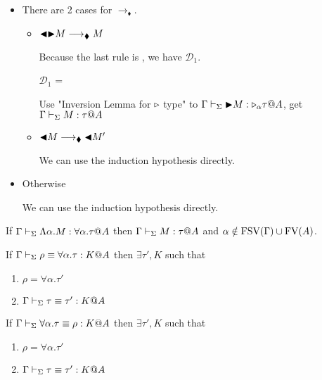 \begin{itemize}
\newcommand{\R}{\longrightarrow_{\blacklozenge}}

\item \TTBL

	      There are 2 cases for $\R$.

	      \begin{itemize}
		      \item $\TBL\TB M \R M$

		            Because the last rule is \TTBL, we have $\mathcal{D}_1$.

		            $\mathcal{D}_1$ = 
		            {}

		            Use "Inversion Lemma for ${\mathop{\triangleright}}$ type" to $\Gamma \vdash_\Sigma {\mathop{\blacktriangleright}} M : {\mathop{\triangleright}}_\alpha \tau @A$,  get $\Gamma \vdash_\Sigma M : \tau @A$

		      \item $\TBL M \R \TBL M'$

		            We can use the induction hypothesis directly.
	      \end{itemize}

	\item Otherwise

	      We can use the induction hypothesis directly.
\end{itemize}

\begin{lemma}
	\begin{item}
	      \item If $\G \V \Lambda\alpha.M : \forall\alpha.\tau@A$ then $\Gamma \vdash_\Sigma M : \tau @A$ and $\alpha \notin \text{FSV}(\Gamma) \cup \text{FV}(A)$.
	      \item If $\Gamma \vdash_\Sigma \rho \equiv \forall\alpha.\tau : K @A$ then $\exists \tau', K$ such that
	      \begin{enumerate}
		      \item $\rho = \forall\alpha.\tau'$
		      \item $\Gamma \vdash_\Sigma \tau \equiv \tau' : K @A$
	      \end{enumerate}
	      \item If $\Gamma \vdash_\Sigma \forall\alpha.\tau \equiv \rho : K @A$ then $\exists \tau', K$ such that
	      \begin{enumerate}
		      \item $\rho = \forall\alpha.\tau'$
		      \item $\Gamma \vdash_\Sigma \tau \equiv \tau' : K @A$
	      \end{enumerate}
	\end{item}
\end{lemma}

